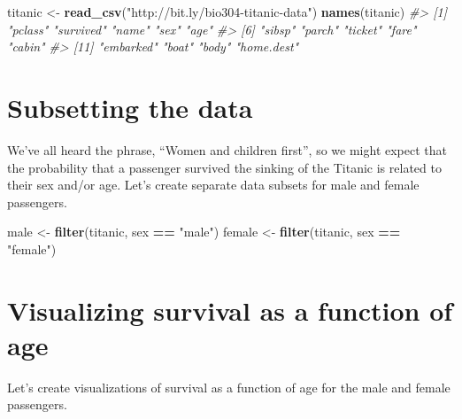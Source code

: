 \documentclass[]{book}
\newenvironment{Shaded}{\begin{snugshade}}{\end{snugshade}}
\newcommand{\CommentTok}[1]{\textcolor[rgb]{0.56,0.35,0.01}{\textit{#1}}}
\newcommand{\KeywordTok}[1]{\textcolor[rgb]{0.13,0.29,0.53}{\textbf{#1}}}
\newcommand{\NormalTok}[1]{#1}
\newcommand{\OperatorTok}[1]{\textcolor[rgb]{0.81,0.36,0.00}{\textbf{#1}}}
\newcommand{\StringTok}[1]{\textcolor[rgb]{0.31,0.60,0.02}{#1}}
\theoremstyle{definition}
\theoremstyle{definition}
\theoremstyle{definition}
\theoremstyle{remark}
\begin{document}
\begin{Shaded}
\begin{Highlighting}[]
\NormalTok{titanic <-}\StringTok{ }\KeywordTok{read_csv}\NormalTok{(}\StringTok{"http://bit.ly/bio304-titanic-data"}\NormalTok{)}
\KeywordTok{names}\NormalTok{(titanic)}
\CommentTok{#>  [1] "pclass"    "survived"  "name"      "sex"       "age"      }
\CommentTok{#>  [6] "sibsp"     "parch"     "ticket"    "fare"      "cabin"    }
\CommentTok{#> [11] "embarked"  "boat"      "body"      "home.dest"}
\end{Highlighting}
\end{Shaded}

\hypertarget{subsetting-the-data}{%
\section{Subsetting the data}\label{subsetting-the-data}}

We've all heard the phrase, ``Women and children first'', so we might
expect that the probability that a passenger survived the sinking of the
Titanic is related to their sex and/or age. Let's create separate data
subsets for male and female passengers.

\begin{Shaded}
\begin{Highlighting}[]
\NormalTok{male <-}\StringTok{ }\KeywordTok{filter}\NormalTok{(titanic, sex }\OperatorTok{==}\StringTok{ "male"}\NormalTok{)}
\NormalTok{female <-}\StringTok{ }\KeywordTok{filter}\NormalTok{(titanic, sex }\OperatorTok{==}\StringTok{ "female"}\NormalTok{)}
\end{Highlighting}
\end{Shaded}

\hypertarget{visualizing-survival-as-a-function-of-age}{%
\section{Visualizing survival as a function of
age}\label{visualizing-survival-as-a-function-of-age}}

Let's create visualizations of survival as a function of age for the
male and female passengers.
\end{document}
